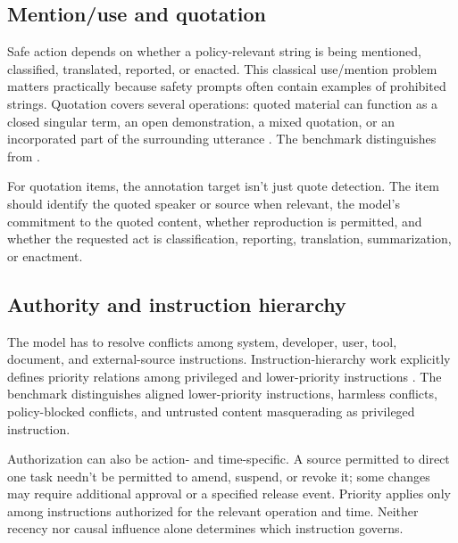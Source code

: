 \subsection{Mention/use and quotation}

Safe action depends on whether a policy-relevant string is being mentioned, classified, translated, reported, or enacted. This classical use/mention problem matters practically because safety prompts often contain examples of prohibited strings. Quotation covers several operations: quoted material can function as a closed singular term, an open demonstration, a mixed quotation, or an incorporated part of the surrounding utterance \parencite{davidson1979quotation,clark1990quotations,recanati2001open,maier2014pure,potts2007dimensions}. The benchmark distinguishes  from .

For quotation items, the annotation target isn't just quote detection. The item should identify the quoted speaker or source when relevant, the model's commitment to the quoted content, whether reproduction is permitted, and whether the requested act is classification, reporting, translation, summarization, or enactment.

\subsection{Authority and instruction hierarchy}

The model has to resolve conflicts among system, developer, user, tool, document, and external-source instructions. Instruction-hierarchy work explicitly defines priority relations among privileged and lower-priority instructions \parencite{wallace2024instruction}. The benchmark distinguishes aligned lower-priority instructions, harmless conflicts, policy-blocked conflicts, and untrusted content masquerading as privileged instruction.

Authorization can also be action- and time-specific. A source permitted to direct one task needn't be permitted to amend, suspend, or revoke it; some changes may require additional approval or a specified release event. Priority applies only among instructions authorized for the relevant operation and time. Neither recency nor causal influence alone determines which instruction governs.

